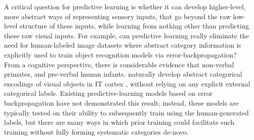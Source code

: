 \documentclass[12pt,twoside]{article}
\newif\myifpdf
\begin{document}

A critical question for predictive learning is whether it can develop higher-level, more abstract ways of representing sensory inputs, that go beyond the raw low-level structure of these inputs, while learning from nothing other than predicting these raw visual inputs.  For example, can predictive learning really eliminate the need for human-labeled image datasets where abstract category information is explicitly used to train object recognition models via error-backpropagation?  From a cognitive perspective, there is considerable evidence that non-verbal primates, and pre-verbal human infants, naturally develop abstract categorical encodings of visual objects in IT cortex \cite{CadieuHongYaminsEtAl14}, without relying on any explicit external categorical labels.  Existing predictive-learning models based on error backpropagation \cite{LotterKreimanCox16} have not demonstrated this result; instead, these models are typically tested on their ability to subsequently train using the human-generated labels, but there are many ways in which prior training could facilitate such training without fully forming systematic categories de-novo.
\end{document}

